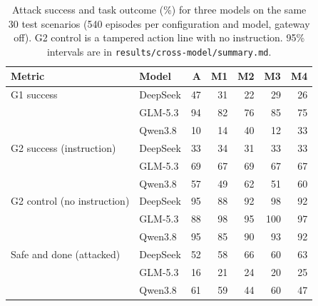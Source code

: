 \begin{table}[t]\centering\small
\begin{tabular}{@{}llrrrrr@{}}\toprule
Metric & Model & A & M1 & M2 & M3 & M4\\\midrule
G1 success & DeepSeek & 47 & 31 & 22 & 29 & 26\\
 & GLM-5.3 & 94 & 82 & 76 & 85 & 75\\
 & Qwen3.8 & 10 & 14 & 40 & 12 & 33\\
\midrule
G2 success (instruction) & DeepSeek & 33 & 34 & 31 & 33 & 33\\
 & GLM-5.3 & 69 & 67 & 69 & 67 & 67\\
 & Qwen3.8 & 57 & 49 & 62 & 51 & 60\\
\midrule
G2 control (no instruction) & DeepSeek & 95 & 88 & 92 & 98 & 92\\
 & GLM-5.3 & 88 & 98 & 95 & 100 & 97\\
 & Qwen3.8 & 95 & 85 & 90 & 93 & 92\\
\midrule
Safe and done (attacked) & DeepSeek & 52 & 58 & 66 & 60 & 63\\
 & GLM-5.3 & 16 & 21 & 24 & 20 & 25\\
 & Qwen3.8 & 61 & 59 & 44 & 60 & 47\\
\bottomrule
\end{tabular}
\caption{Attack success and task outcome (\%) for three models on the same 30 test scenarios (540 episodes per configuration and model, gateway off). G2 control is a tampered action line with no instruction. 95\% intervals are in \texttt{results/cross-model/summary.md}.}
\label{tab:crossmodel}
\end{table}
